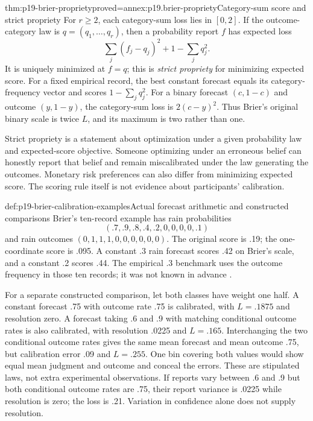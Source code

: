 \begin{hbtheorem}{thm:p19-brier-propriety}{proved=annex:p19.brier-propriety}{Category-sum score and strict propriety}
For \(r\geq2\), each category-sum loss lies in \([0,2]\). If the
outcome-category law is \(q=(q_1,\ldots,q_r)\), then a probability report
\(f\) has expected loss
\[
 \sum_j(f_j-q_j)^2+1-\sum_jq_j^2.
\]
It is uniquely minimized at \(f=q\); this is \emph{strict propriety} for
minimizing expected score. For a fixed empirical record, the best constant
forecast equals its category-frequency vector and scores
\(1-\sum_jq_j^2\).
For a binary forecast \((c,1-c)\) and outcome \((y,1-y)\), the
category-sum loss is \(2(c-y)^2\). Thus Brier's original binary scale is
twice \(L\), and its maximum is two rather than one.
\end{hbtheorem}

Strict propriety is a statement about optimization under a given probability
law and expected-score objective. Someone optimizing under an erroneous
belief can honestly report that belief and remain miscalibrated under the
law generating the outcomes. Monetary risk preferences can also differ from
minimizing expected score. The scoring rule itself is not evidence about
participants' calibration.

\begin{hbexample}{def:p19-brier-calibration-examples}{Actual forecast arithmetic and constructed comparisons}
Brier's ten-record example has rain probabilities
\[
 (.7,.9,.8,.4,.2,0,0,0,0,.1)
\]
and rain outcomes \((0,1,1,1,0,0,0,0,0,0)\). The original score is
.19; the one-coordinate score is .095. A constant .3 rain forecast scores
.42 on Brier's scale, and a constant .2 scores .44. The empirical .3
benchmark uses the outcome frequency in those ten records; it was not known
in advance \cite[p.~2, table~1]{Brier1950Verification}.

For a separate constructed comparison, let both classes have weight one
half. A constant forecast .75 with outcome rate .75 is calibrated, with
\(L=.1875\) and resolution zero. A forecast taking .6 and .9 with matching
conditional outcome rates is also calibrated, with resolution .0225 and
\(L=.165\). Interchanging the two conditional outcome rates gives the same
mean forecast and mean outcome .75, but calibration error .09 and
\(L=.255\). One bin covering both values would show equal mean judgment
and outcome and conceal the errors. These are stipulated laws, not extra
experimental observations.
If reports vary between .6 and .9 but both conditional outcome rates are
.75, their report variance is .0225 while resolution is zero; the loss
is .21. Variation in confidence alone does not supply resolution.
\end{hbexample}

